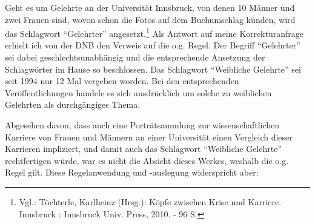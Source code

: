\documentclass[a4paper,
fontsize=11pt,
oneside,
numbers=noperiodatend,
parskip=half-,
bibliography=totoc,
final
]{scrartcl}
\begin{document}
Geht es um Gelehrte an der Universität Innsbruck, von denen 10 Männer
und zwei Frauen sind, wovon schon die Fotos auf dem Buchumschlag künden,
wird das Schlagwort \enquote{Gelehrter} angesetzt.\footnote{Vgl.:
  Töchterle, Karlheinz (Hrsg.): Köpfe zwischen Krise und Karriere.
  Innsbruck : Innsbruck Univ. Press, 2010. - 96 S.} Als Antwort auf
meine Korrekturanfrage erhielt ich von der DNB den Verweis auf die o.g.
Regel. Der Begriff \enquote{Gelehrter} sei dabei geschlechtsunabhängig
und die entsprechende Ansetzung der Schlagwörter im Hause so
beschlossen. Das Schlagwort \enquote{Weibliche Gelehrte} sei seit 1994
nur 12 Mal vergeben worden. Bei den entsprechenden Veröffentlichungen
handele es sich ausdrücklich um solche zu weiblichen Gelehrten als
durchgängiges Thema.

Abgesehen davon, dass auch eine Porträtsammlung zur wissenschaftlichen
Karriere von Frauen und Männern an einer Universität einen Vergleich
dieser Karrieren impliziert, und damit auch das Schlagwort
\enquote{Weibliche Gelehrte} rechtfertigen würde, war es nicht die
Absicht dieses Werkes, weshalb die o.g. Regel gilt. Diese Regelanwendung
und -auslegung widerspricht aber:
\end{document}
